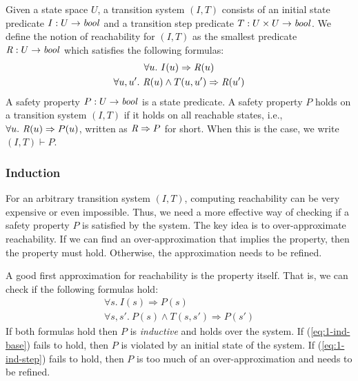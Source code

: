 Given a state space $U$, a transition system $(I,T)$ consists of an
initial state predicate $I : U \to \mathit{bool}$ and a transition step
predicate $T : U \times U \to \mathit{bool}$.
We define the notion of
reachability for $(I, T)$ as the smallest predicate $\mathit{R} : U \to
\mathit{bool}$ which satisfies the following formulas:
\begin{gather*}
  \forall u.~ I(u) \Rightarrow \mathit{R}(u) \\
  \forall u, u'.~ \mathit{R}(u) \land T(u, u') \Rightarrow \mathit{R}(u')
\end{gather*}
A safety property $P : U \to \mathit{bool}$ is a state predicate. A safety
property $P$ holds on a transition system $(I, T)$ if it holds on all
reachable states, i.e., $\forall u.~ \mathit{R}(u) \Rightarrow P(u)$,
written as $\mathit{R} \Rightarrow P$ for short. When this is the case, we
write $(I, T)\vdash P$.

\subsubsection{Induction}
\label{sec:induction}
For an arbitrary transition system $(I, T)$, computing reachability
can be very expensive or even impossible. Thus, we need a more
effective way of checking if a safety property $P$ is satisfied by the
system. The key idea is to over-approximate reachability. If we can
find an over-approximation that implies the property, then the
property must hold. Otherwise, the approximation needs to be refined.

A good first approximation for reachability is the property itself.
That is, we can check if the following formulas hold:
\begin{gather}
  \forall s.~ I(s) \Rightarrow P(s)
  \label{eq:1-ind-base} \\
  \forall s, s'.~ P(s) \land T(s, s') \Rightarrow P(s')
  \label{eq:1-ind-step}
\end{gather}
If both formulas hold then $P$ is {\em inductive} and holds over the
system. If (\ref{eq:1-ind-base}) fails to hold, then $P$ is violated
by an initial state of the system. If (\ref{eq:1-ind-step}) fails to
hold, then $P$ is too much of an over-approximation and needs to be
refined.

